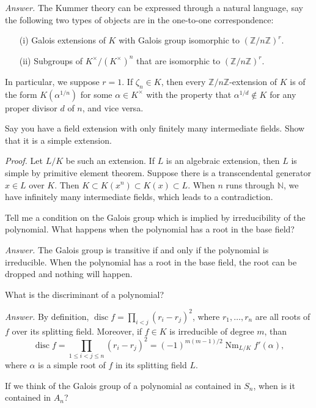 \documentclass{mathproblems}
\newcommand\Z{\mathbb{Z}}
\newcommand\N{\mathbb{N}}
\DeclareMathOperator{\disc}{disc}
\begin{document}
\begin{questions}
\textit{Answer.} The Kummer theory can be expressed through a natural language, say the following two types of objects are in the one-to-one correspondence: \vspace{-4pt}
\begin{itemize}
\item[(i)] Galois extensions of $K$ with Galois group isomorphic to $(\Z/n\Z)^r$.

\item[(ii)] Subgroups of $K^\times/(K^\times)^n$ that are isomorphic to $(\Z/n\Z)^r$.
\end{itemize}\vspace{-4pt}
In particular, we suppose $r=1$. If $\zeta_n \in K$, then every $\mathbb{Z} / n \mathbb{Z}$-extension of $K$ is of the form $K(\alpha^{1 / n})$ for some $\alpha \in K^\times$ with the property that $\alpha^{1 / d} \notin K$ for any proper divisor $d$ of $n$, and vice versa. 


\miquestion
{\color{blue} Say you have a field extension with only finitely many intermediate fields. Show that it is a simple extension.}

\textit{Proof.} Let $L/K$ be such an extension. If $L$ is an algebraic extension, then $L$ is simple by primitive element theorem. Suppose there is a transcendental generator $x\in L$ over $K$. Then $K\subset K(x^n)\subset K(x)\subset L$. When $n$ runs through $\N$, we have infinitely many intermediate fields, which leads to a contradiction. 



\miquestion
{\color{blue} Tell me a condition on the Galois group which is implied by irreducibility of the polynomial. What happens when the polynomial has a root in the base field?}

\textit{Answer.}
The Galois group is transitive if and only if the polynomial is irreducible. When the polynomial has a root in the base field, the root can be dropped and nothing will happen.

\miquestion
{\color{blue} What is the discriminant of a polynomial?}

\textit{Answer.}
By definition, $\operatorname{disc} f=\prod_{i<j}(r_i-r_j)^2$, where $r_1,\ldots,r_n$ are all roots of $f$ over its splitting field. Moreover, if $f\in K$ is irreducible of degree $m$, than
$$
\disc f=\prod_{1\leq i<j\leq n}(r_i-r_j)^2=(-1)^{m(m-1)/2}\operatorname{Nm}_{L/K} f'(\alpha),
$$
where $\alpha$ is a simple root of $f$ in its splitting field $L$.

\miquestion
{\color{blue} If we think of the Galois group of a polynomial as contained in $S_{n}$, when is it contained in $A_{n}$?}


\end{questions}
\end{document}
